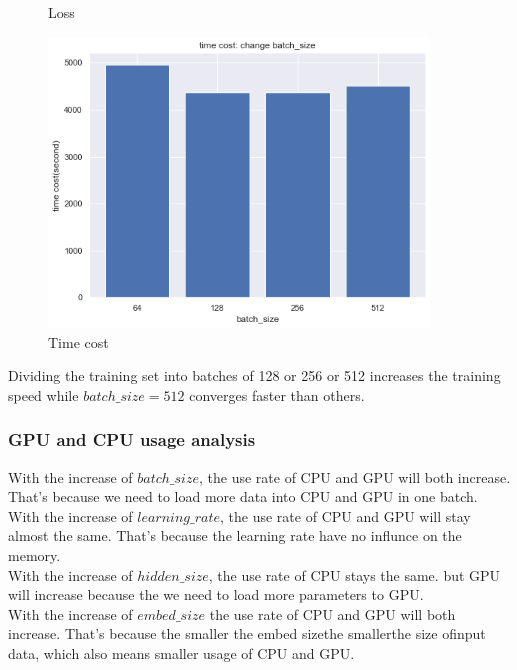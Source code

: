 \begin{figure}[H]
\begin{minipage}[b]{0.3\textwidth}
    \caption{Loss}
    \label{Fig.2}
    \end{minipage}
    \begin{minipage}[b]{0.3\textwidth}
    \centering 
    \includegraphics[width=0.9\textwidth]{time_batch.png}
    \caption{Time cost}
    \label{Fig.2}
    \end{minipage}
\end{figure}
Dividing the training set into batches of 128 or 256 or 512 increases the training speed while $batch\_size = 512$ converges faster than others.
\subsubsection{GPU and CPU usage analysis}
With the increase of $batch\_size$, the use rate of CPU and GPU will both increase. That's because we need to load more data into CPU and GPU in one batch.\\
With the increase of $learning\_rate$, the use rate of CPU and GPU will stay almost the same. That's because the learning rate have no influnce on the memory.\\
With the increase of $hidden\_size$, the use rate of CPU stays the same. but GPU will increase because the we
need to load more parameters to GPU.\\
With the increase of $embed\_size$ the use rate of CPU and GPU will both increase. That's because the smaller the embed sizethe smallerthe size ofinput data, which also means smaller usage of CPU and GPU.\\



